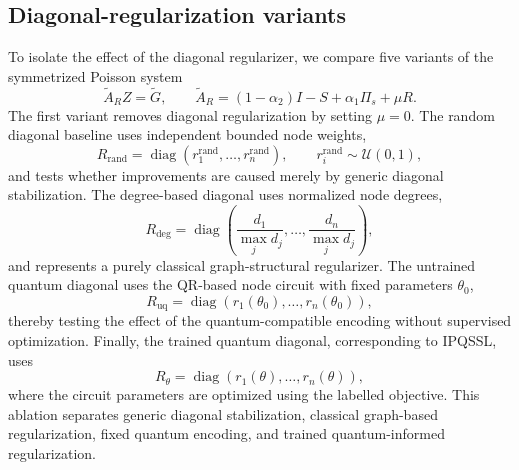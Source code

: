 \documentclass[11pt,a4paper]{article}
\begin{document}
\subsection{Diagonal-regularization variants}
\label{subsec:diagonal_regularization_ablations}
To isolate the effect of the diagonal regularizer, we compare five variants
of the symmetrized Poisson system
\[
\widetilde A_R Z = \widetilde G,
\qquad
\widetilde A_R
=
(1-\alpha_2)I - S + \alpha_1 \Pi_s + \mu R.
\]
The first variant removes diagonal regularization by setting \(\mu=0\).
The random diagonal baseline uses independent bounded node weights,
\[
R_{\mathrm{rand}}
=
\operatorname{diag}(r^{\mathrm{rand}}_1,\ldots,r^{\mathrm{rand}}_n),
\qquad
r^{\mathrm{rand}}_i \sim \mathcal U(0,1),
\]
and tests whether improvements are caused merely by generic diagonal
stabilization. The degree-based diagonal uses normalized node degrees,
\[
R_{\mathrm{deg}}
=
\operatorname{diag}
\left(
\frac{d_1}{\max_j d_j},\ldots,
\frac{d_n}{\max_j d_j}
\right),
\]
and represents a purely classical graph-structural regularizer. The
untrained quantum diagonal uses the QR-based node circuit with fixed
parameters \(\theta_0\),
\[
R_{\mathrm{uq}}
=
\operatorname{diag}
\left(
r_1(\theta_0),\ldots,r_n(\theta_0)
\right),
\]
thereby testing the effect of the quantum-compatible encoding without
supervised optimization. Finally, the trained quantum diagonal,
corresponding to IPQSSL, uses
\[
R_{\theta}
=
\operatorname{diag}
\left(
r_1(\theta),\ldots,r_n(\theta)
\right),
\]
where the circuit parameters are optimized using the labelled objective.
This ablation separates generic diagonal stabilization, classical
graph-based regularization, fixed quantum encoding, and trained
quantum-informed regularization.
\end{document}
